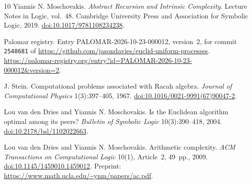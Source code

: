 \documentclass[11pt]{article}
\theoremstyle{remark}
\begin{document}
\begin{thebibliography}{10}
Yiannis N. Moschovakis.
\emph{Abstract Recursion and Intrinsic Complexity}.
Lecture Notes in Logic, vol.~48. Cambridge University Press and Association
for Symbolic Logic, 2019.
\href{https://doi.org/10.1017/9781108234238}{doi:10.1017/9781108234238}.

Palomar registry. Entry PALOMAR-2026-10-23-000012, version~2, for commit
\texttt{2548681} of \url{https://github.com/jasondavies/euclid-uniform-processes}.
\url{https://palomar-registry.org/entry?id=PALOMAR-2026-10-23-000012&version=2}.

J. Stein.
Computational problems associated with Racah algebra.
\emph{Journal of Computational Physics} 1(3):397--405, 1967.
\href{https://doi.org/10.1016/0021-9991(67)90047-2}{doi:10.1016/0021-9991(67)90047-2}.

Lou van den Dries and Yiannis N. Moschovakis.
Is the Euclidean algorithm optimal among its peers?
\emph{Bulletin of Symbolic Logic} 10(3):390--418, 2004.
\href{https://doi.org/10.2178/bsl/1102022663}{doi:10.2178/bsl/1102022663}.

Lou van den Dries and Yiannis N. Moschovakis.
Arithmetic complexity.
\emph{ACM Transactions on Computational Logic} 10(1), Article~2, 49~pp., 2009.
\href{https://doi.org/10.1145/1459010.1459012}{doi:10.1145/1459010.1459012}.
Preprint: \url{https://www.math.ucla.edu/~ynm/papers/ac.pdf}.
\end{thebibliography}
\end{document}
